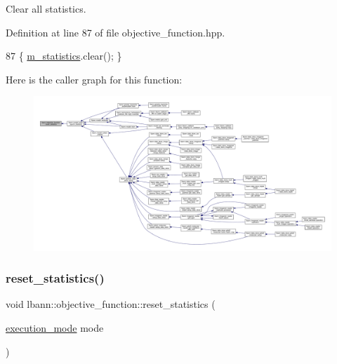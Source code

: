 Clear all statistics. 

Definition at line 87 of file objective\+\_\+function.\+hpp.


\begin{DoxyCode}
87 \{ \hyperlink{classlbann_1_1objective__function_ad5daa18c52374a849c6fbd515bcc1eb1}{m\_statistics}.clear(); \}
\end{DoxyCode}
Here is the caller graph for this function\+:\nopagebreak
\begin{figure}[H]
\begin{center}
\leavevmode
\includegraphics[width=350pt]{classlbann_1_1objective__function_acf7a6c67e7a45a1fd03684ca897d6324_icgraph}
\end{center}
\end{figure}
\mbox{\label{classlbann_1_1objective__function_a3c564d26d6c75007ae95153cef3b8c02}} 
\subsubsection{\texorpdfstring{reset\+\_\+statistics()}{reset\_statistics()}\hspace{0.1cm}{\footnotesize\ttfamily [2/2]}}
{\footnotesize\ttfamily void lbann\+::objective\+\_\+function\+::reset\+\_\+statistics (\begin{DoxyParamCaption}\item[{\hyperlink{base_8hpp_a2781a159088df64ed7d47cc91c4dc0a8}{execution\+\_\+mode}}]{mode }\end{DoxyParamCaption})\hspace{0.3cm}{\ttfamily [inline]}}

